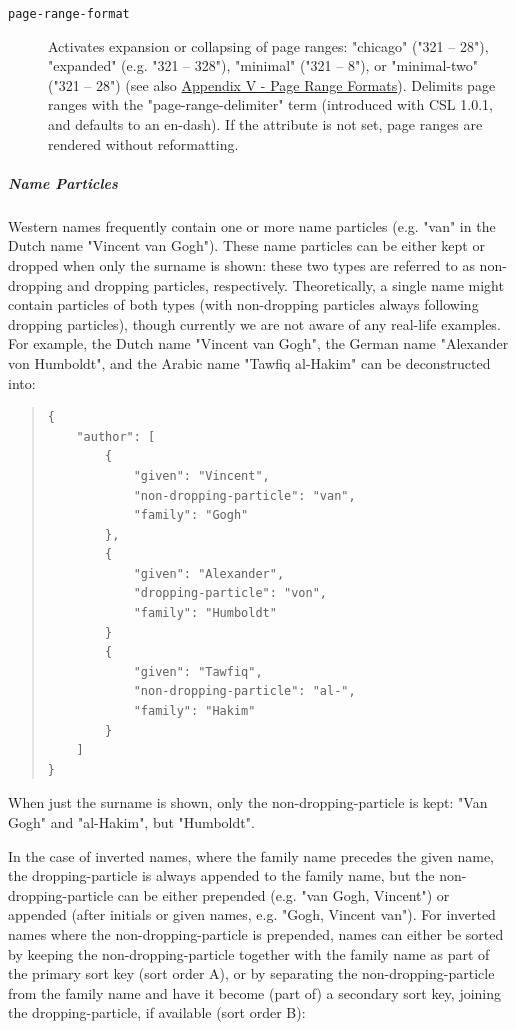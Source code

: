 \begin{description}
\item[\texttt{page-range-format}]
Activates expansion or collapsing of page ranges: "chicago" ("321 --
28"), "expanded" (e.g. "321 -- 328"), "minimal" ("321 -- 8"), or
"minimal-two" ("321 -- 28") (see also
\protect\hyperlink{appendix-v---page-range-formats}{Appendix V - Page
Range Formats}). Delimits page ranges with the "page-range-delimiter"
term (introduced with CSL 1.0.1, and defaults to an en-dash). If the
attribute is not set, page ranges are rendered without reformatting.
\end{description}

\hypertarget{name-particles}{%
\subparagraph{Name Particles}\label{name-particles}}

Western names frequently contain one or more name particles (e.g. "van"
in the Dutch name "Vincent van Gogh"). These name particles can be
either kept or dropped when only the surname is shown: these two types
are referred to as non-dropping and dropping particles, respectively.
Theoretically, a single name might contain particles of both types (with
non-dropping particles always following dropping particles), though
currently we are not aware of any real-life examples. For example, the
Dutch name "Vincent van Gogh", the German name "Alexander von Humboldt",
and the Arabic name "Tawfiq al-Hakim" can be deconstructed into:

\begin{quote}
\begin{verbatim}
{
    "author": [
        {
            "given": "Vincent",
            "non-dropping-particle": "van",
            "family": "Gogh"
        },
        {
            "given": "Alexander",
            "dropping-particle": "von",
            "family": "Humboldt"
        }
        {
            "given": "Tawfiq",
            "non-dropping-particle": "al-",
            "family": "Hakim"
        }
    ]
}
\end{verbatim}
\end{quote}

When just the surname is shown, only the non-dropping-particle is kept:
"Van Gogh" and "al-Hakim", but "Humboldt".

In the case of inverted names, where the family name precedes the given
name, the dropping-particle is always appended to the family name, but
the non-dropping-particle can be either prepended (e.g. "van Gogh,
Vincent") or appended (after initials or given names, e.g. "Gogh,
Vincent van"). For inverted names where the non-dropping-particle is
prepended, names can either be sorted by keeping the
non-dropping-particle together with the family name as part of the
primary sort key (sort order A), or by separating the
non-dropping-particle from the family name and have it become (part of)
a secondary sort key, joining the dropping-particle, if available (sort
order B):

